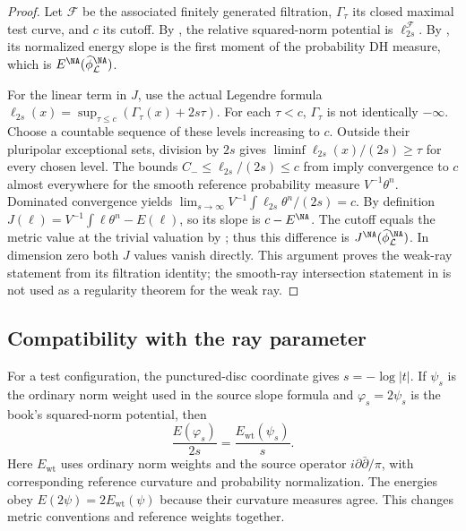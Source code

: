 \begin{proof}
Let $\mathcal F$ be the associated finitely generated filtration,
$\Gamma_\tau$ its closed maximal test curve, and $c$ its cutoff.
By , the relative squared-norm potential is
$\ell_{2s}^{\mathcal F}$. By , its normalized
energy slope is the first moment of the probability DH measure, which is
$E^{\NA}(\widehat\phi_{\mathcal L}^{\NA})$.

For the linear term in $J$, use the actual Legendre formula
$\ell_{2s}(x)=\sup_{\tau\leq c}(\Gamma_\tau(x)+2s\tau)$.
For each $\tau<c$, $\Gamma_\tau$ is not identically $-\infty$.
Choose a countable sequence of these levels increasing to $c$.
Outside their pluripolar exceptional sets, division by $2s$ gives
$\liminf\ell_{2s}(x)/(2s)\geq\tau$ for every chosen level.
The bounds $C_-\leq\ell_{2s}/(2s)\leq c$ from
 imply convergence to $c$ almost
everywhere for the smooth reference probability measure $V^{-1}\theta^n$.
Dominated convergence yields
$\lim_{s\to\infty}V^{-1}\int\ell_{2s}\theta^n/(2s)=c$.
By definition $J(\ell)=V^{-1}\int\ell\theta^n-E(\ell)$, so its slope is
$c-E^{\NA}$. The cutoff equals the metric value at the trivial valuation
by ; thus this difference is
$J^{\NA}(\widehat\phi_{\mathcal L}^{\NA})$. In dimension zero both $J$
values vanish directly. This argument proves the weak-ray statement from
its filtration identity; the smooth-ray intersection statement in
 is not used as a regularity theorem
for the weak ray.
\end{proof}

\subsection{Compatibility with the ray parameter}
\label{sec:hybrid-ray-parameter}

For a test configuration, the punctured-disc coordinate gives
$s=-\log|t|$.  If $\psi_s$ is the ordinary norm weight used in the
source slope formula and $\varphi_s=2\psi_s$ is the book's squared-norm
potential, then
\[
 \frac{E(\varphi_s)}{2s}=\frac{E_{\mathrm{wt}}(\psi_s)}s.
\tag{66.41}\label{eq:hybrid-ray-factor-two-test}
\]
Here $E_{\mathrm{wt}}$ uses ordinary norm weights and the source operator
$i\partial\bar\partial/\pi$, with corresponding reference curvature and
probability normalization. The energies obey $E(2\psi)=2E_{\mathrm{wt}}(\psi)$
because their curvature measures agree. This changes metric conventions
and reference weights together.

